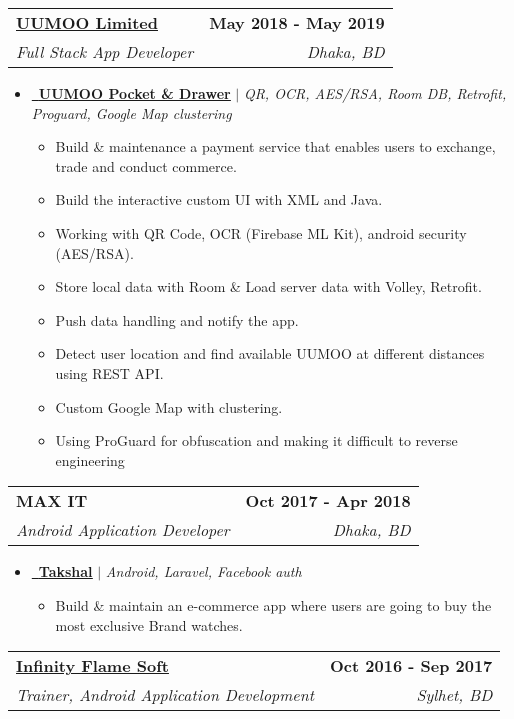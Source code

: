 \documentclass[letterpaper,11pt]{article}
\makeatletter
\newcommand{\resumeItem}[1]{
  \item\small{
    {#1 \vspace{-2pt}}
  }
}
\newcommand{\resumeSubheading}[4]{
  \vspace{-2pt}\item
    \begin{tabular*}{1.0\textwidth}[t]{l@{\extracolsep{\fill}}r}
      \textbf{#1} & \textbf{\small #2} \\
      \textit{\small#3} & \textit{\small #4} \\
    \end{tabular*}\vspace{-7pt}
}
\newcommand{\resumeItemListStart}{\begin{itemize}}
\newcommand{\resumeItemListEnd}{\end{itemize}\vspace{-5pt}}
\makeatother
\begin{document}
    \resumeSubheading
      {\href{https://www.uumoo.com.bd/}{UUMOO Limited}}{May 2018 - May 2019}
      {Full Stack App Developer}{Dhaka, BD}
      \resumeItemListStart
        \resumeItem {\href{https://drive.google.com/drive/folders/1X2iBtjhOmny8VFmWlqiz21AhMAnCbTnk}{\raisebox{-0.2\height}\ \underline{\textbf{UUMOO Pocket \& Drawer}}} $|$ \emph{QR, OCR, AES/RSA, Room DB, Retrofit, Proguard, Google Map clustering}}\\
          {
            \begin{itemize}
            \item Build \& maintenance a payment service that enables users to exchange, trade and
            conduct commerce.
            \item Build the interactive custom UI with XML and Java.
            \item Working with QR Code, OCR (Firebase ML Kit), android security (AES/RSA).
            \item Store local data with Room \& Load server data with Volley, Retrofit.
            \item Push data handling and notify the app.
            \item Detect user location and find available UUMOO at different distances using REST API.
            \item Custom Google Map with clustering.
            \item Using ProGuard for obfuscation and making it difficult to reverse engineering
            \end{itemize}}
      \resumeItemListEnd

    \resumeSubheading
      {MAX IT}{Oct 2017 - Apr 2018}
      {Android Application Developer}{Dhaka, BD}
      \resumeItemListStart
        \resumeItem {\href{https://play.google.com/store/apps/details?id=net.maxitbd.takshal&hl=en&gl=US}{\raisebox{-0.2\height}\ \underline{\textbf{Takshal}}} $|$ \emph{Android, Laravel, Facebook auth}}\\
          {\begin{itemize}
            \item Build \& maintain an e-commerce app where users are going to buy the most exclusive Brand watches.
         \end{itemize}}
      \resumeItemListEnd

      \resumeSubheading
      {\href{https://infinityflamesoft.com/}{Infinity Flame Soft}}{Oct 2016 - Sep 2017}
      {Trainer, Android Application Development}{Sylhet, BD}
    
\end{document}
